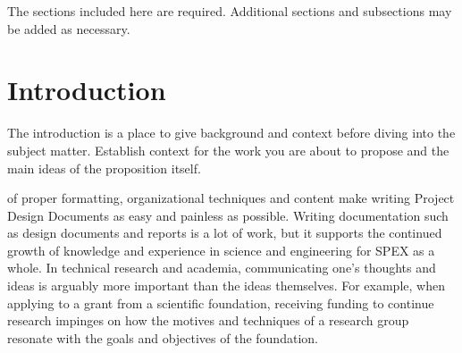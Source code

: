 \documentclass[journal]{SPEXformat}
\newenvironment{help}{
  \ttfamily\footnotesize\sloppy
  \begin{lrbox}{\helpbox}\begin{minipage}{\linewidth}
  }{
  \end{minipage}\end{lrbox}
  \ifbool{showhelp}{
    \fbox{\usebox{\helpbox}}
  }{}
}
\begin{document}
\label{sec:nomenclature}
\newcommand{\nomunit}[1]{%
\renewcommand{\nomentryend}{\hspace*{\fill}#1}}
\renewcommand{\nompreamble}{
  \begin{help}
    If you include mathematical expressions or express variables in the design document, list them with their corresponding definitions here as a list.
    The two lines below make it look nice when defining units/values to constants.

    Note that math terms and non-math terms are separated and alphabetized, regardless of the order in which they are defined. (Recall terms \$like this\$ are in the math environment)
    Read more about advanced nomenclature formatting here:\\
    \url{https://www.sharelatex.com/learn/Nomenclatures}
  \end{help}
  }

\printnomenclature{}
\begin{help}
  The sections included here are required. Additional sections and subsections may be added as necessary.
\end{help}
\section{Introduction}
\label{sec:introduction}
\begin{help}
  The introduction is a place to give background and context before diving into the subject matter.
  Establish context for the work you are about to propose and the main ideas of the proposition itself.
\end{help}

 of proper formatting, organizational techniques and content make writing Project Design Documents as easy and painless as possible.
Writing documentation such as design documents and reports is a lot of work, but it supports the continued growth of knowledge and experience in science and engineering for SPEX as a whole.
In technical research and academia, communicating one's thoughts and ideas is arguably more important than the ideas themselves.
For example, when applying to a grant from a scientific foundation, receiving funding to continue research impinges on how the motives and techniques of a research group resonate with the goals and objectives of the foundation.
\end{document}

